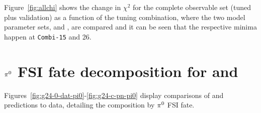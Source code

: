 Figure~\ref{fig:allchi} shows the change in $\chi^2$ for the complete observable set (tuned plus validation) as a function of the tuning combination, where the two model parameter sets, \allpar and \redpar, are compared and it can be seen that the respective minima happen at \texttt{Combi-15} and 26. 
 

\section{$\pi^0$ FSI fate decomposition for \gZero and \gC}\label{sec:appfate}

Figures~\ref{fig:g24-0-dat-pi0}-\ref{fig:g24-c-pn-pi0} display comparisons of  \gZero and \gC predictions to data, detailing the composition by $\pi^0$ FSI fate.

\newpage

